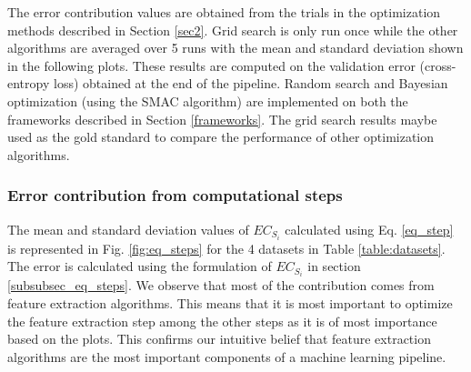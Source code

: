 The error contribution values are obtained from the trials in the optimization methods described in Section \ref{sec2}. Grid search is only run once while the other algorithms are averaged over 5 runs with the mean and standard deviation shown in the following plots. These results are computed on the validation error (cross-entropy loss) obtained at the end of the pipeline. Random search and Bayesian optimization (using the SMAC algorithm) are implemented on both the frameworks described in Section \ref{frameworks}. The grid search results maybe used as the gold standard to compare the performance of other optimization algorithms. 

\subsubsection{Error contribution from computational steps}
The mean and standard deviation values of $EC_{S_i}$ calculated using Eq. \ref{eq_step} is represented in Fig. \ref{fig:eq_steps} for the 4 datasets in Table \ref{table:datasets}. The error is calculated using the formulation of $EC_{S_i}$ in section \ref{subsubsec_eq_steps}. We observe that most of the contribution comes from feature extraction algorithms. This means that it is most important to optimize the feature extraction step among the other steps as it is of most importance based on the plots. This confirms our intuitive belief that feature extraction algorithms are the most important components of a machine learning pipeline. 
